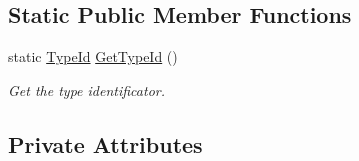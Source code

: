 \subsection*{Static Public Member Functions}
\begin{DoxyCompactItemize}
\item 
static \hyperlink{classns3_1_1TypeId}{Type\+Id} \hyperlink{classns3_1_1dsr_1_1DsrOptionRerrUnreachHeader_a0d84276887fd9481f3c45105c3abd2cb}{Get\+Type\+Id} ()
\begin{DoxyCompactList}\small\item\em Get the type identificator. \end{DoxyCompactList}\end{DoxyCompactItemize}
\subsection*{Private Attributes}

